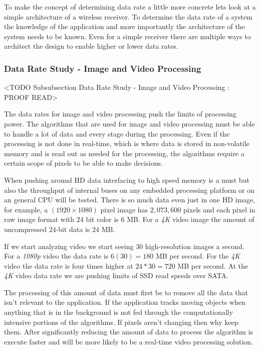 To make the concept of determining data rate a little more concrete lets look at a simple architecture of a wireless receiver. To determine the data rate of a system the knowledge of the application and more importantly the architecture of the system needs to be known. Even for a simple receiver there are multiple ways to architect the design to enable higher or lower data rates. 

\subsubsection{Data Rate Study - Image and Video Processing}
	<TODO Subsubsection  Data Rate Study - Image and Video Processing : PROOF READ>

The data rates for image and video processing push the limits of processing power. The algorithms that are used for image and video processing must be able to handle a lot of data and every stage during the processing. Even if the processing is not done in real-time, which is where data is stored in non-volatile memory and is read out as needed for the processing, the algorithms require a certain scope of pixels to be able to make decisions.

When pushing around \ac{HD} data interfacing to high speed memory is a must but also the throughput of internal buses on any embedded processing platform or on an general \ac{CPU} will be tested. There is so much data even just in one \ac{HD} image, for example, a $(1920\times1080)$ pixel image has $2,073,600$ pixels and each pixel in raw image format with $24$ bit color is $6$ \ac{MB}. For a \emph{4K} video image the amount of uncompressed $24$-bit data is $24$ \ac{MB}.

If we start analyzing video we start seeing $30$ high-resolution images a second. For a \emph{1080p} video the data rate is $6(30)=180$ \ac{MB} per second. For the \emph{4K} video the data rate is four times higher at $24*30=720$ \ac{MB} per second. At the \emph{4K} video data rate we are pushing limits of \ac{SSD} read speeds over \ac{SATA}.

The processing of this amount of data must first be to remove all the data that isn't relevant to the application. If the application tracks moving objects when anything that is in the background is not fed through the computationally intensive portions of the algorithms. If pixels aren't changing then why keep them. After significantly reducing the amount of data to process the algorithm is execute faster and will be more likely to be a real-time video processing solution.
	
